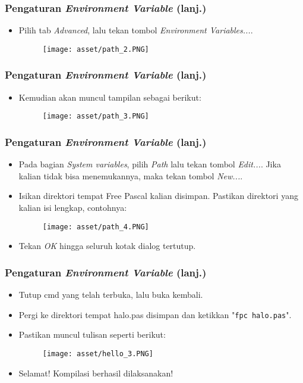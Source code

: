 \begin{frame}
\frametitle{Pengaturan \textit{Environment Variable} (lanj.)}
\begin{itemize}
  \item Pilih tab \textit{Advanced}, lalu tekan tombol \textit{Environment Variables...}.
  \begin{figure}
    \texttt{[image: asset/path\_2.PNG]}
  \end{figure}
\end{itemize}
\end{frame}

\begin{frame}
\frametitle{Pengaturan \textit{Environment Variable} (lanj.)}
\begin{itemize}
  \item Kemudian akan muncul tampilan sebagai berikut:
  \begin{figure}
    \texttt{[image: asset/path\_3.PNG]}
  \end{figure}
\end{itemize}
\end{frame}

\begin{frame}
\frametitle{Pengaturan \textit{Environment Variable} (lanj.)}
\begin{itemize}
  \item Pada bagian \textit{System variables}, pilih \textit{Path} lalu tekan tombol \textit{Edit...}. Jika kalian tidak bisa menemukannya, maka tekan tombol \textit{New...}.
  \item Isikan direktori tempat Free Pascal kalian disimpan. Pastikan direktori yang kalian isi lengkap, contohnya:
  \begin{figure}
    \texttt{[image: asset/path\_4.PNG]}
  \end{figure}
  \item Tekan \textit{OK} hingga seluruh kotak dialog tertutup.
\end{itemize}
\end{frame}

\begin{frame}
\frametitle{Pengaturan \textit{Environment Variable} (lanj.)}
\begin{itemize}
  \item Tutup cmd yang telah terbuka, lalu buka kembali.
  \item Pergi ke direktori tempat halo.pas disimpan dan ketikkan "\texttt{fpc halo.pas}".
  \item Pastikan muncul tulisan seperti berikut:
  \begin{figure}
    \texttt{[image: asset/hello\_3.PNG]}
  \end{figure}
  \item Selamat! Kompilasi berhasil dilaksanakan!
\end{itemize}
\end{frame}

